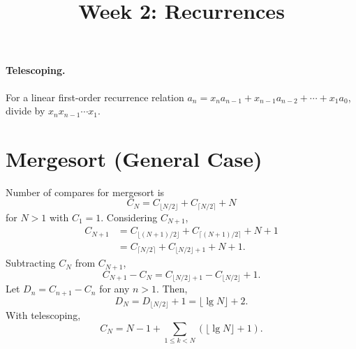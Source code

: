\documentclass{article}
\begin{document}
\title{Week 2: Recurrences}
\maketitle

\paragraph{Telescoping.} For a linear first-order recurrence relation $a_n =
x_na_{n - 1} + x_{n - 1}a_{n - 2} + \cdots + x_1a_0$, divide by $x_nx_{n - 1}
\cdots{}x_1$.

\section{Mergesort (General Case)}

Number of compares for mergesort is
\begin{equation*}
  C_N = C_{\lfloor N/2 \rfloor} + C_{\lceil N/2 \rceil} + N
\end{equation*} for $N > 1$ with $C_1 = 1$. Considering $C_{N + 1}$,
\begin{align*}
  C_{N + 1} &= C_{\lfloor (N+1)/2 \rfloor} + C_{\lceil (N+1)/2 \rceil} + N + 1
    \\
    &= C_{\lceil N/2 \rceil} + C_{\lfloor N/2 \rfloor + 1} + N + 1.
\end{align*} Subtracting $C_N$ from $C_{N + 1}$, \begin{equation*}
  C_{N + 1} - C_N = C_{\lfloor N/2 \rfloor + 1} - C_{\lfloor N/2 \rfloor} + 1.
\end{equation*} Let $D_n = C_{n + 1} - C_n$ for any $n > 1$. Then,
\begin{equation*}
  D_N = D_{\lfloor N/2 \rfloor} + 1 = \lfloor \lg{N} \rfloor + 2.
\end{equation*} With telescoping, \begin{equation*}
  C_N = N - 1 + \sum_{1 \leq k < N}(\lfloor \lg{N} \rfloor + 1).
\end{equation*}
\end{document}
